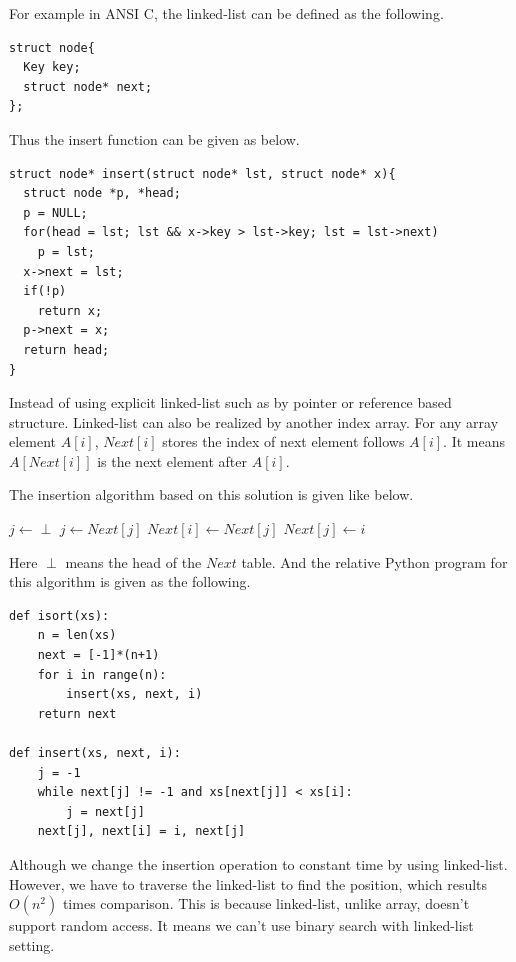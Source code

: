 \documentclass[b5paper]{article}
\begin{document}
For example in ANSI C, the linked-list can be defined as the following.

\lstset{language=C}
\begin{lstlisting}
struct node{
  Key key;
  struct node* next;
};
\end{lstlisting}

Thus the insert function can be given as below.

\begin{lstlisting}
struct node* insert(struct node* lst, struct node* x){
  struct node *p, *head;
  p = NULL;
  for(head = lst; lst && x->key > lst->key; lst = lst->next)
    p = lst;
  x->next = lst;
  if(!p)
    return x;
  p->next = x;
  return head;
}
\end{lstlisting}

Instead of using explicit linked-list such as by pointer or reference
based structure. Linked-list can also be realized by another index array.
For any array element $A[i]$, $Next[i]$ stores the index of next element
follows $A[i]$. It means $A[Next[i]]$ is the next element after $A[i]$.

The insertion algorithm based on this solution is given like below.

\begin{algorithmic}
  \State $j \gets \perp$
    \State $j \gets Next[j]$
  \EndWhile
  \State $Next[i] \gets Next[j]$
  \State $Next[j] \gets i$
\EndFunction
\end{algorithmic}

Here $\perp$ means the head of the $Next$ table.
And the relative Python program for this algorithm is given as the following.

\lstset{language=Python}
\begin{lstlisting}
def isort(xs):
    n = len(xs)
    next = [-1]*(n+1)
    for i in range(n):
        insert(xs, next, i)
    return next

def insert(xs, next, i):
    j = -1
    while next[j] != -1 and xs[next[j]] < xs[i]:
        j = next[j]
    next[j], next[i] = i, next[j]
\end{lstlisting}

Although we change the insertion operation to constant time by using
linked-list. However, we have to traverse the linked-list to find the
position, which results $O(n^2)$ times comparison. This is because
linked-list, unlike array, doesn't support random access. It means we
can't use binary search with linked-list setting.
\end{document}

